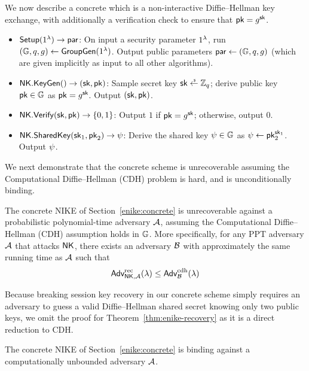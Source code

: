 We now describe a concrete \ENIKE which is a non-interactive Diffie--Hellman key exchange,
with additionally a verification check to ensure that $\mathsf{pk} = g^{\mathsf{sk}}$.

\begin{itemize}
    \item $\mathsf{Setup}(1^\lambda) \rightarrow \mathsf{par}$:
    On input a security parameter $1^\lambda$,
    run $(\mathbb{G}, q, g) \gets \mathsf{GroupGen}(1^{\lambda})$.
    Output public parameters $\mathsf{par} \gets (\mathbb{G}, q, g)$ (which are given implicitly as input to all other algorithms).

  \item $\mathsf{NK}.\mathsf{KeyGen}() \rightarrow (\mathsf{sk}, \mathsf{pk})$: Sample secret key $\sk \rgets \Zq$; derive public key $\mathsf{pk}\in \mathbb{G}$ as $\mathsf{pk} = g^{\mathsf{sk}}$.
	    Output $(\mathsf{sk}, \mathsf{pk})$.
  \item $\mathsf{NK}.\mathsf{Verify}(\mathsf{sk}, \mathsf{pk}) \rightarrow \{ 0, 1\}$: Output $1$ if $\mathsf{pk} = g^{\mathsf{sk}}$; otherwise, output $0$.
  \item $\mathsf{NK}.\mathsf{SharedKey}(\mathsf{sk}_1, \mathsf{pk}_2) \rightarrow \psi $: Derive the shared key $\psi \in \mathbb{G}$ as $\psi \gets \mathsf{pk}_2^{\mathsf{sk}_1}$.
    Output $\psi$.
\end{itemize}

We next demonstrate that the concrete scheme is unrecoverable assuming the Computational Diffie--Hellman (CDH) problem is hard,
and is unconditionally binding.

\begin{theorem} \label{thm:enike-recovery}
  The concrete NIKE of Section~\ref{enike:concrete} is unrecoverable against a probabilistic polynomial-time adversary $\mathcal{A}$,
  assuming the Computational Diffie--Hellman (CDH) assumption holds in $\mathbb{G}$.
  More specifically, for any PPT adversary $\mathcal{A}$ that attacks $\mathsf{NK}$,
  there exists an adversary $\mathcal{B}$ with approximately the same running time as $\mathcal{A}$ such that
  \[
    \textsf{\upshape Adv}^{\textrm{\upshape rec}}_{\mathsf{NK},\mathcal{A}}(\lambda)  \leq \textsf{\upshape Adv}^{\textrm{\upshape cdh}}_{\mathcal{B}}(\lambda)
  \]
\end{theorem}

Because breaking session key recovery in our concrete scheme simply requires an adversary to guess a valid Diffie--Hellman shared secret knowing only two public keys,
we omit the proof for Theorem~\ref{thm:enike-recovery} as it is a direct reduction to CDH.


\begin{theorem} \label{thm:enike-binding}
  The concrete NIKE of Section~\ref{enike:concrete} is binding against a computationally unbounded adversary $\mathcal{A}$.
\end{theorem}

